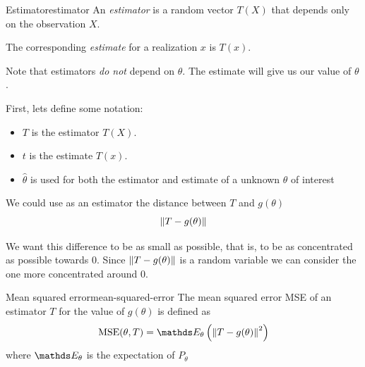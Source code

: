 \documentclass[12pt]{extarticle}
\begin{document}
\begin{definition}{Estimator}{estimator}
	An \emph{estimator} is a random vector $T(X)$ that depends only on the observation $X$.

	The corresponding \emph{estimate} for a realization $x$ is $T(x)$.
\end{definition}

Note that estimators \emph{do not} depend on $\theta$.
The estimate will give us our value of $\theta$.

First, lets define some notation:
\begin{itemize}
	\item $T$ is the estimator $T(X)$.
	\item $t$ is the estimate $T(x)$.
	\item $\hat \theta$ is used for both the estimator and estimate of a unknown $\theta$ of interest
\end{itemize}

We could use as an estimator the distance between $T$ and $g(\theta)$
\begin{equation}
	\norm{T - g(\theta)}
\end{equation}

We want this difference to be as small as possible, that is, to be as concentrated as possible towards $0$.
Since $\norm{T - g(\theta)}$ is a random variable we can consider the one more concentrated around $0$.

\newcommand{\MSE}{{\operatorfont MSE}}

\begin{definition}{Mean squared error}{mean-squared-error}
	The mean squared error MSE of an estimator $T$ for the value of $g(\theta)$ is defined as
	\begin{equation}
		\MSE(\theta, T) = \E_\theta\left(\norm{T - g(\theta)}^2\right)
	\end{equation}
	where $\E_\theta$ is the expectation of $P_\theta$
\end{definition}
\end{document}
